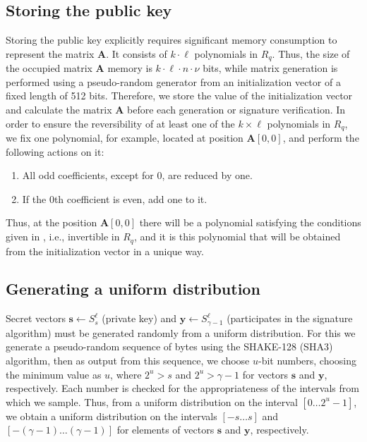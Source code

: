 \documentclass{article}
\theoremstyle{plain}
\theoremstyle{definition}
\begin{document}
    \subsection{Storing the public key}
    \label{sec:storing_pk}

    Storing the public key explicitly requires significant memory consumption to represent the matrix $\mathbf{A}$. It consists of $k \cdot \ell$ polynomials in $R_q$. Thus, the size of the occupied matrix $\mathbf{A}$ memory is $k \cdot \ell \cdot n \cdot \nu$ bits, while matrix generation is performed using a pseudo-random generator from an initialization vector of a fixed length of 512 bits. Therefore, we store the value of the initialization vector and calculate the matrix $\mathbf{A}$ before each generation or signature verification. In order to ensure the reversibility of at least one of the $k \times \ell$ polynomials in $R_q$, we fix one polynomial, for example, located at position $\mathbf{A}[0,0]$, and perform the following actions on it:
    \begin{enumerate}
        \item All odd coefficients, except for 0, are reduced by one.
        \item If the 0th coefficient is even, add one to it.
    \end{enumerate}

    Thus, at the position $\mathbf{A}[0,0]$ there will be a polynomial satisfying the conditions given in \cite[Theorem 11.1]{Wat07}, i.e., invertible in $R_q$, and it is this polynomial that will be obtained from the initialization vector in a unique way.

    \subsection{Generating a uniform distribution}
    \label{sec:uniform_distribution}

    Secret vectors $\mathbf{s} \leftarrow S^{\ell}_{s}$ (private key) and $\mathbf{y} \leftarrow S^{\ell}_{\gamma - 1}$ (participates in the signature algorithm) must be generated randomly from a uniform distribution. For this we generate a pseudo-random sequence of bytes using the SHAKE-128 (SHA3) algorithm, then as output from this sequence, we choose $u$-bit numbers, choosing the minimum value as $u$, where $2^{u} > s$ and $2^{u} > \gamma - 1$ for vectors $\mathbf{s}$ and $\mathbf{y}$, respectively. Each number is checked for the appropriateness of the intervals from which we sample. Thus, from a uniform distribution on the interval $[0 \dots 2^{u} - 1]$, we obtain a uniform distribution on the intervals $[-s \dots s]$ and $[- (\gamma - 1) \dots (\gamma - 1)]$ for elements of vectors $\mathbf{s}$ and $\mathbf{y}$, respectively.
\end{document}

